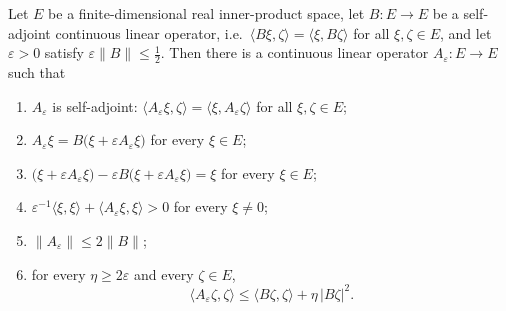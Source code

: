 \begin{lemma}
Let $E$ be a finite-dimensional real inner-product space, let $B:E\to E$ be a
self-adjoint continuous linear operator, i.e.\
$\langle B\xi,\zeta\rangle=\langle\xi,B\zeta\rangle$ for all $\xi,\zeta\in E$,
and let $\varepsilon>0$ satisfy $\varepsilon\|B\|\le\tfrac12$. Then there is a
continuous linear operator $A_\varepsilon:E\to E$ such that
\begin{enumerate}
\item[(R1)] $A_\varepsilon$ is self-adjoint:
  $\langle A_\varepsilon\xi,\zeta\rangle
   =\langle\xi,A_\varepsilon\zeta\rangle$ for all $\xi,\zeta\in E$;
\item[(R2)] $A_\varepsilon\xi=B\bigl(\xi+\varepsilon A_\varepsilon\xi\bigr)$ for
  every $\xi\in E$;
\item[(R3)] $\bigl(\xi+\varepsilon A_\varepsilon\xi\bigr)
  -\varepsilon B\bigl(\xi+\varepsilon A_\varepsilon\xi\bigr)=\xi$ for every
  $\xi\in E$;
\item[(R4)] $\varepsilon^{-1}\langle\xi,\xi\rangle
  +\langle A_\varepsilon\xi,\xi\rangle>0$ for every $\xi\ne0$;
\item[(R5)] $\|A_\varepsilon\|\le2\|B\|$;
\item[(R6)] for every $\eta\ge2\varepsilon$ and every $\zeta\in E$,
  \[
    \langle A_\varepsilon\zeta,\zeta\rangle
     \le\langle B\zeta,\zeta\rangle+\eta\,|B\zeta|^2 .
  \]
\end{enumerate}
\end{lemma}

